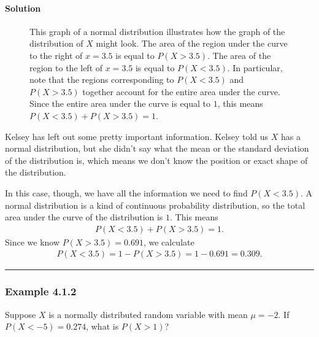 \documentclass[letterpaper,10pt,english]{jupyterBook}
\begin{document}
\paragraph{Solution}
\label{\detokenize{Ch4 The Normal Distribution and the Central Limit Theorem/4.1 Properties of the Normal Distribution:solution}}
\begin{figure}[htbp]
\centering
\capstart

\noindent{}
\caption{This graph of a normal distribution illustrates how the graph of the distribution of \(X\) might look. The area of the region under the curve to the right of \(x = 3.5\) is equal to \(P(X > 3.5)\). The area of the region to the left of \(x = 3.5\) is equal to \(P(X < 3.5)\). In particular, note that the regions corresponding to \(P(X < 3.5)\) and \(P(X > 3.5)\) together account for the entire area under the curve. Since the entire area under the curve is equal to \(1\), this means \(P(X < 3.5) + P(X > 3.5) = 1\).}\label{\detokenize{Ch4 The Normal Distribution and the Central Limit Theorem/4.1 Properties of the Normal Distribution:normal-ex1}}\end{figure}

\sphinxAtStartPar
Kelsey has left out some pretty important information. Kelsey told us \(X\) has a normal distribution, but she didn’t say what the mean or the standard deviation of the distribution is, which means we don’t know the position or exact shape of the distribution.

\sphinxAtStartPar
In this case, though, we have all the information we need to find \(P(X < 3.5)\). A normal distribution is a kind of continuous probability distribution, so the total area under the curve of the distribution is \(1\). This means
\begin{equation*}
\begin{split} P(X < 3.5) + P(X > 3.5) = 1. \end{split}
\end{equation*}
\sphinxAtStartPar
Since we know \(P(X > 3.5) = 0.691\), we calculate
\begin{equation*}
\begin{split} P(X < 3.5) = 1 - P(X > 3.5) = 1 - 0.691 = 0.309. \end{split}
\end{equation*}

\bigskip\hrule\bigskip



\subsubsection{Example 4.1.2}
\label{\detokenize{Ch4 The Normal Distribution and the Central Limit Theorem/4.1 Properties of the Normal Distribution:example-4-1-2}}
\sphinxAtStartPar
Suppose \(X\) is a normally distributed random variable with mean \(\mu = -2\). If \(P(X < -5) = 0.274\), what is \(P(X > 1)\)?
\end{document}
